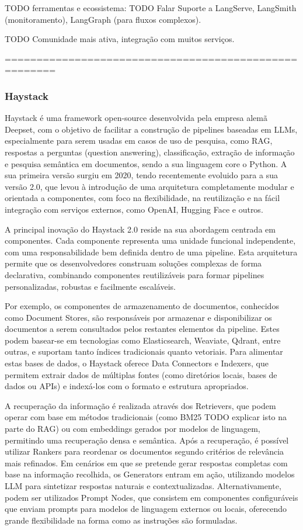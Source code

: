 TODO ferramentas e ecossistema: 
TODO Falar Suporte a LangServe, LangSmith (monitoramento), LangGraph (para fluxos complexos).

TODO Comunidade mais ativa, integração com muitos serviços.


======================================================



\subsubsection{Haystack}


Haystack é uma framework open-source desenvolvida pela empresa alemã Deepset, com o objetivo de facilitar a construção de pipelines baseadas em LLMs, especialmente para serem usadas em casos de uso de pesquisa, como RAG, respostas a perguntas (question answering), classificação, extração de informação e pesquisa semântica em documentos, sendo a sua linguagem core o Python. A sua primeira versão surgiu em 2020, tendo recentemente evoluido para a sua versão 2.0, que levou à introdução de uma arquitetura completamente modular e orientada a componentes, com foco na flexibilidade, na reutilização e na fácil integração com serviços externos, como OpenAI, Hugging Face e outros.

A principal inovação do Haystack 2.0 reside na sua abordagem centrada em componentes. Cada componente representa uma unidade funcional independente, com uma responsabilidade bem definida dentro de uma pipeline. Esta arquitetura permite que os desenvolvedores construam soluções complexas de forma declarativa, combinando componentes reutilizáveis para formar pipelines personalizadas, robustas e facilmente escaláveis.

Por exemplo, os componentes de armazenamento de documentos, conhecidos como Document Stores, são responsáveis por armazenar e disponibilizar os documentos a serem consultados pelos restantes elementos da pipeline. Estes podem basear-se em tecnologias como Elasticsearch, Weaviate, Qdrant, entre outras, e suportam tanto índices tradicionais quanto vetoriais. Para alimentar estas bases de dados, o Haystack oferece Data Connectors e Indexers, que permitem extrair dados de múltiplas fontes (como diretórios locais, bases de dados ou APIs) e indexá-los com o formato e estrutura apropriados.

A recuperação da informação é realizada através dos Retrievers, que podem operar com base em métodos tradicionais (como BM25 TODO explicar isto na parte do RAG) ou com embeddings gerados por modelos de linguagem, permitindo uma recuperação densa e semântica. Após a recuperação, é possível utilizar Rankers para reordenar os documentos segundo critérios de relevância mais refinados. Em cenários em que se pretende gerar respostas completas com base na informação recolhida, os Generators entram em ação, utilizando modelos LLM para sintetizar respostas naturais e contextualizadas. Alternativamente, podem ser utilizados Prompt Nodes, que consistem em componentes configuráveis que enviam prompts para modelos de linguagem externos ou locais, oferecendo grande flexibilidade na forma como as instruções são formuladas.

